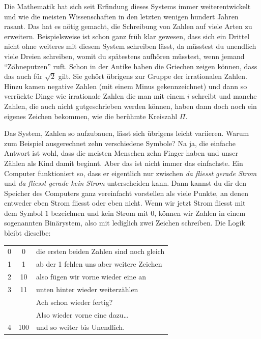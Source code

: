 Die Mathematik hat sich seit Erfindung dieses Systems immer weiterentwickelt und wie die meisten Wissenschaften in den letzten wenigen hundert Jahren rasant. Das hat es nötig gemacht, die Schreibung von Zahlen auf viele Arten zu erweitern. Beispielsweise ist schon ganz früh klar gewesen, dass sich ein Drittel nicht ohne weiteres mit diesem System schreiben lässt, da müsstest du unendlich viele Dreien schreiben, womit du spätestens aufhören müsstest, wenn jemand \enquote{Zähneputzen} ruft. Schon in der Antike haben die Griechen zeigen können, dass das auch für $\sqrt{2}$ gilt. Sie gehört übrigens zur Gruppe der irrationalen Zahlen. Hinzu kamen negative Zahlen (mit einem Minus gekennzeichnet) und dann so verrückte Dinge wie irrationale Zahlen die man mit einem $i$ schreibt und manche Zahlen, die auch nicht gutgeschrieben werden können, haben dann doch noch ein eigenes Zeichen bekommen, wie die berühmte Kreiszahl $\Pi$.

Das System, Zahlen so aufzubauen, lässt sich übrigens leicht variieren. Warum zum Beispiel ausgerechnet zehn verschiedene Symbole? Na ja, die einfache Antwort ist wohl, dass die meisten Menschen zehn Finger haben und unser Zählen als Kind damit beginnt. Aber das ist nicht immer das einfachste. Ein Computer funktioniert so, dass er eigentlich nur zwischen \textit{da fliesst gerade Strom} und \textit{da fliesst gerade kein Strom} unterscheiden kann. Dann kannst du dir den Speicher des Computers ganz vereinfacht vorstellen als viele Punkte, an denen entweder eben Strom fliesst oder eben nicht. Wenn wir jetzt Strom fliesst mit dem Symbol $1$ bezeichnen und kein Strom mit $0$, können wir Zahlen in einem sogenannten Binärystem, also mit lediglich zwei Zeichen schreiben. Die Logik bleibt dieselbe:

\begin{small}
\begin{center}
\begin{tabular}{ c c l }
0 & 0 & die ersten beiden Zahlen sind noch gleich\\
1 & 1 & ab der 1 fehlen uns aber weitere Zeichen \\
 2 & 10 & also fügen wir vorne wieder eine an \\ 
 3 & 11 & unten hinter wieder weiterzählen\\
    & & Ach schon wieder fertig?\\
    && Also wieder vorne eine dazu\dots \\
4 & 100 & und so weiter bis Unendlich.
\end{tabular}
\end{center}
\end{small}

